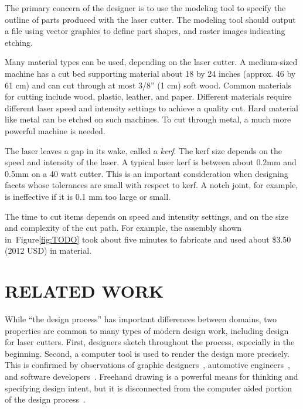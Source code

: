 \documentclass{article}
\begin{document}
The primary concern of the designer is to use the modeling tool to
specify the outline of parts produced with the laser cutter. The
modeling tool should output a file using vector graphics to define
part shapes, and raster images indicating etching. 

Many material types can be used, depending on the laser cutter. A
medium-sized machine has a cut bed supporting material about 18 by 24
inches (approx. 46 by 61 cm) and can cut through at most 3/8'' (1 cm)
soft wood. Common materials for cutting include wood, plastic,
leather, and paper. Different materials require different laser speed
and intensity settings to achieve a quality cut. Hard material like
metal can be etched on such machines. To cut through metal, a much
more powerful machine is needed. 

The laser leaves a gap in its wake, called a \textit{kerf}. The kerf
size depends on the speed and intensity of the laser. A typical laser
kerf is between about 0.2mm and 0.5mm on a 40 watt cutter. This is an
important consideration when designing facets whose tolerances are
small with respect to kerf. A notch joint, for example, is ineffective
if it is 0.1 mm too large or small.

The time to cut items depends on speed and intensity settings, and on
the size and complexity of the cut path. For example, the assembly
shown in~Figure\ref{fig:TODO} took about five minutes to fabricate and
used about \$3.50 (2012 USD) in material. 


\section{RELATED WORK}

While ``the design process'' has important differences between
domains, two properties are common to many types of modern design
work, including design for laser cutters. First, designers sketch
throughout the process, especially in the beginning. Second, a
computer tool is used to render the design more precisely. This is
confirmed by observations of graphic
designers~\cite{wong-rr-prototypes}, automotive
engineers~\cite{kara-styling}, and software
developers~\cite{dekel-improvised-notation}. Freehand drawing is a
powerful means for thinking and specifying design intent, but it is
disconnected from the computer aided portion of the design
process~\cite{company-sketching-in-engineering}.
\end{document}
